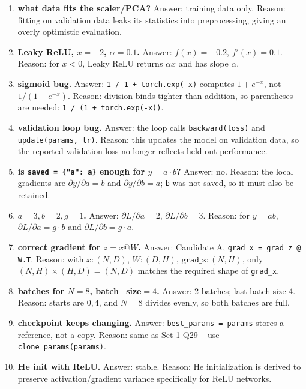 \documentclass[11pt]{article}
\begin{document}
\begin{enumerate}

\item \textbf{what data fits the scaler/PCA?}
Answer: training data only.
Reason: fitting on validation data leaks its statistics into
preprocessing, giving an overly optimistic evaluation.

\item \textbf{Leaky ReLU, $x=-2$, $\alpha=0.1$.}
Answer: $f(x)=-0.2$, $f'(x)=0.1$.
Reason: for $x<0$, Leaky ReLU returns $\alpha x$ and has slope $\alpha$.

\item \textbf{sigmoid bug.}
Answer: \texttt{1 / 1 + torch.exp(-x)} computes $1 + e^{-x}$, not
$1/(1+e^{-x})$.
Reason: division binds tighter than addition, so parentheses are needed:
\texttt{1 / (1 + torch.exp(-x))}.

\item \textbf{validation loop bug.}
Answer: the loop calls \texttt{backward(loss)} and \texttt{update(params,
lr)}.
Reason: this updates the model on validation data, so the reported
validation loss no longer reflects held-out performance.

\item \textbf{is \texttt{saved = \{"a": a\}} enough for $y=a{\cdot}b$?}
Answer: no.
Reason: the local gradients are $\partial y/\partial a=b$ and
$\partial y/\partial b=a$; \texttt{b} was not saved, so it must also be
retained.

\item \textbf{$a=3,b=2,g=1$.}
Answer: $\partial L/\partial a = 2$, $\partial L/\partial b = 3$.
Reason: for $y=ab$, $\partial L/\partial a = g\cdot b$ and
$\partial L/\partial b = g\cdot a$.

\item \textbf{correct gradient for $z=x@W$.}
Answer: Candidate A, \texttt{grad\_x = grad\_z @ W.T}.
Reason: with $x:(N,D)$, $W:(D,H)$, $\texttt{grad\_z}:(N,H)$, only
$(N,H)\!\times\!(H,D)=(N,D)$ matches the required shape of \texttt{grad\_x}.

\item \textbf{batches for $N=8$, batch\_size$=4$.}
Answer: 2 batches; last batch size 4.
Reason: starts are $0,4$, and $N=8$ divides evenly, so both batches are
full.

\item \textbf{checkpoint keeps changing.}
Answer: \texttt{best\_params = params} stores a reference, not a copy.
Reason: same as Set 1 Q29 -- use \texttt{clone\_params(params)}.

\item \textbf{He init with ReLU.}
Answer: stable.
Reason: He initialization is derived to preserve activation/gradient
variance specifically for ReLU networks.

\end{enumerate}
\end{document}
